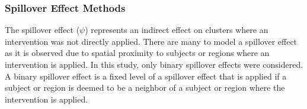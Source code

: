 \documentclass{article}[11pt]
\begin{document}
\subsubsection{Spillover Effect Methods}\label{Section:SpilloverEffectMethods}

The spillover effect ($\psi$) represents an indirect effect on clusters where an intervention was not directly applied\cite{benjamin-chung_spillover_2017}\cite{benjamin-chung_extension_2024}. There are many to model a spillover effect as it is observed due to spatial proximity to subjects or regions where an intervention is applied. In this study, only binary spillover effects were considered. A binary spillover effect is a fixed level of a spillover effect that is applied if a subject or region is deemed to be a neighbor of a subject or region where the intervention is applied. 



\end{document}
